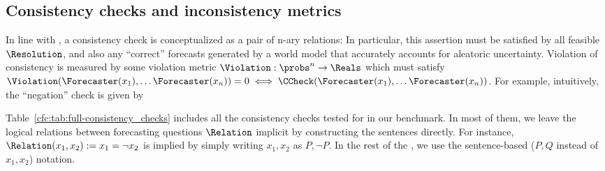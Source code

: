 \subsection{Consistency checks and inconsistency metrics}
\label{cfc:sec:consistency-checks-intro}
\label{cfc:app:checks}

In line with \citet{esmwcc}, a consistency check is conceptualized as a pair of n-ary relations: 
In particular, this assertion must be satisfied by all feasible $\Resolution$, and also any ``correct'' forecasts generated by a world model that accurately accounts for aleatoric uncertainty.
Violation of consistency is measured by some violation metric $\Violation:\probs^n\to\Reals$ which must satisfy $\Violation(\Forecaster(x_1),\dots\Forecaster(x_n))=0\iff\CCheck(\Forecaster(x_1),\dots\Forecaster(x_n))$.
%
For example, intuitively, the ``negation'' check \NegChecker{} is given by 

Table~\ref{cfc:tab:full-consistency_checks} includes all the consistency checks tested for in our benchmark. In most of them, we leave the logical relations between forecasting questions $\Relation$ implicit by constructing the sentences directly. For instance, $\Relation(x_1,x_2):=x_1=\lnot x_2$ is implied by simply writing $x_1, x_2$ as $P, \lnot P$. In the rest of the , we use the sentence-based ($P, Q$ instead of $x_1, x_2$) notation.

